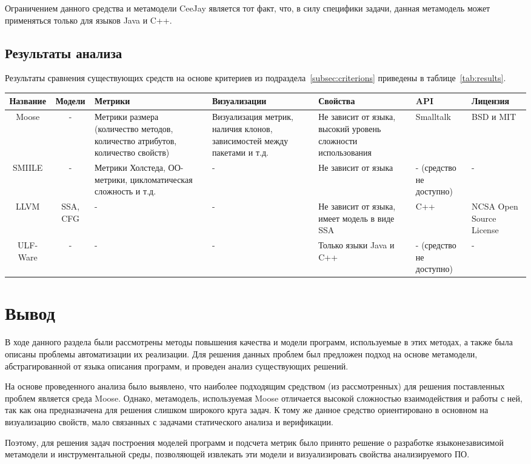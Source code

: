 Ограничением данного средства и метамодели CeeJay является тот факт, что, в силу
специфики задачи, данная метамодель может применяться только для языков Java и
C++.

\subsection{Результаты анализа}

Результаты сравнения существующих средств на основе критериев из
подраздела~\ref{subsec:criterions} приведены в таблице~\ref{tab:results}.

\begin{sidewaystable}
\caption{Результаты сравнения существующих решений}
\scriptsize
\begin{tabularx}{\textwidth}{|c|c|X|X|X|X|X|}
\hline
Название & Модели & Метрики & Визуализации & Свойства & API & Лицензия \\ \hline
Moose & - & Метрики размера (количество методов, количество атрибутов, количество свойств) & Визуализация метрик, наличия клонов, зависимостей между пакетами и т.д. & Не зависит от языка, высокий уровень сложности использования & Smalltalk & BSD и MIT \\ \hline
SMIILE & - & Метрики Холстеда, ОО-метрики, цикломатическая сложность и т.д. & - & Не зависит от языка & - (средство не доступно) & - \\ \hline
LLVM & SSA, CFG & - & - & Не зависит от языка, имеет модель в виде SSA & C++ & NCSA Open Source License \\ \hline
ULF-Ware & - & - & - & Только языки Java и C++ & - (средство не доступно) & - \\ \hline
\end{tabularx}
\label{tab:results}
\end{sidewaystable}

\section{Вывод}

В ходе данного раздела были рассмотрены методы повышения качества и модели
программ, используемые в этих методах, а также была описаны проблемы
автоматизации их реализации. Для решения данных проблем был предложен подход на
основе метамодели, абстрагированной от языка описания программ, и проведен
анализ существующих решений.

На основе проведенного анализа было выявлено, что наиболее подходящим средством
(из рассмотренных) для решения поставленных проблем является среда Moose.
Однако, метамодель, используемая Moose отличается высокой сложностью
взаимодействия и работы с ней, так как она предназначена для решения слишком
широкого круга задач. К тому же данное средство ориентировано в основном на
визуализацию свойств, мало связанных с задачами статического анализа и
верификации.

Поэтому, для решения задач построения моделей программ и подсчета метрик было
принято решение о разработке языконезависимой метамодели и инструментальной
среды, позволяющей извлекать эти модели и визуализировать свойства
анализируемого ПО.
